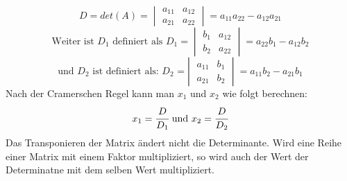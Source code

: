 \documentclass[a4paper,10pt]{scrartcl}
\begin{document}
        \[
            D = det(A) = 
            \begin{vmatrix}
                a_{11} & a_{12} \\
                a_{21} & a_{22}
            \end{vmatrix}
            = a_{11}a_{22} - a_{12}a_{21}
        \]
        \[
            \text{Weiter ist $D_1$ definiert als $D_1$} = 
            \begin{vmatrix}
                b_{1} & a_{12} \\
                b_{2} & a_{22}
            \end{vmatrix}
            = a_{22}b_1 - a_{12}b_2 
        \]
        \[
            \text{und $D_2$ ist definiert als: $D_2$ =} 
            \begin{vmatrix}
                a_{11} & b_{1} \\
                a_{21} & b_{2}
            \end{vmatrix}
            = a_{11}b_2 - a_{21}b_1
        \]
        Nach der Cramerschen Regel kann man $x_1$ und $x_2$ wie folgt berechnen: 
        \[
            x_1 = \cfrac{D}{D_1} \text{ und } x_2 = \cfrac{D}{D_2}
        \]
        Das Transponieren der Matrix ändert nicht die Determinante. Wird eine Reihe einer Matrix mit einem Faktor multipliziert, so wird auch der Wert der Determinatne mit dem selben 
        Wert multipliziert. 
        \newpage
\end{document}
